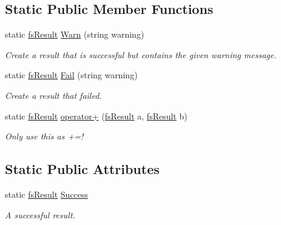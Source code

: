 \subsection*{Static Public Member Functions}
\begin{DoxyCompactItemize}
\item 
static \hyperlink{struct_full_serializer_1_1fs_result}{fs\+Result} \hyperlink{struct_full_serializer_1_1fs_result_a28eab13689fc7ff2b0a1d0326e044463}{Warn} (string warning)
\begin{DoxyCompactList}\small\item\em Create a result that is successful but contains the given warning message. \end{DoxyCompactList}\item 
static \hyperlink{struct_full_serializer_1_1fs_result}{fs\+Result} \hyperlink{struct_full_serializer_1_1fs_result_a668c1169410a20364aa7c53f98d00617}{Fail} (string warning)
\begin{DoxyCompactList}\small\item\em Create a result that failed. \end{DoxyCompactList}\item 
static \hyperlink{struct_full_serializer_1_1fs_result}{fs\+Result} \hyperlink{struct_full_serializer_1_1fs_result_a6625430da8b5013745d6eb7c1512f1e6}{operator+} (\hyperlink{struct_full_serializer_1_1fs_result}{fs\+Result} a, \hyperlink{struct_full_serializer_1_1fs_result}{fs\+Result} b)
\begin{DoxyCompactList}\small\item\em Only use this as +=! \end{DoxyCompactList}\end{DoxyCompactItemize}
\subsection*{Static Public Attributes}
\begin{DoxyCompactItemize}
\item 
static \hyperlink{struct_full_serializer_1_1fs_result}{fs\+Result} \hyperlink{struct_full_serializer_1_1fs_result_a21c921f6a0a99b1ba5acc993e669f3cc}{Success}
\begin{DoxyCompactList}\small\item\em A successful result. \end{DoxyCompactList}\end{DoxyCompactItemize}
